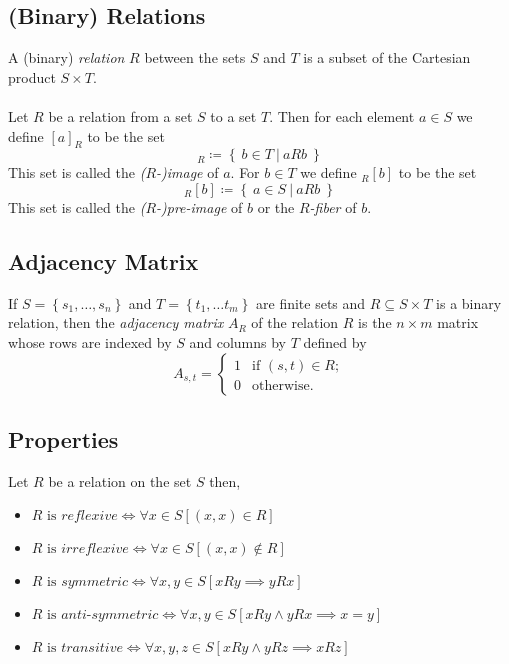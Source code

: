 \documentclass[fleqn]{article}
\begin{document}
\subsection{(Binary) Relations}
A (binary) \textit{relation} $R$ between the sets $S$ and $T$ is a subset of the Cartesian product $S \times T$.\\
\\
Let $R$ be a relation from a set $S$ to a set $T$. Then for each element $a \in S$
we define $[a]_R$ to be the set
\begin{equation*}
    [a]_R \coloneqq \left\{\ b \in T\ |\ aRb\ \right\}
\end{equation*}
This set is called the \textit{($R$-)image} of $a$.
For $b \in T$ we define $_R[b]$ to be the set
\begin{equation*}
    _R[b] \coloneqq \left\{\ a \in S\ |\ aRb\ \right\}
\end{equation*}
This set is called the \textit{($R$-)pre-image} of $b$ or the \textit{$R$-fiber} of $b$.

\subsection{Adjacency Matrix}
If $S = \left\{ s_1, \dots, s_n \right\}$ and $T = \left\{ t_1, \dots t_m \right\}$
are finite sets and $R \subseteq S \times T$ is a binary relation, then the
\textit{adjacency matrix} $A_R$ of the relation $R$ is the $n \times m$ matrix whose
rows are indexed by $S$ and columns by $T$ defined by
\begin{equation*}
    A_{s,t}= \begin{cases}
        1 & \text{if } (s,t) \in R; \\
        0 & \text{otherwise}.
    \end{cases}
\end{equation*}

\subsection{Properties}
\label{sec:Properties}
Let $R$ be a relation on the set $S$ then,
\begin{itemize}
    \item $R \text{ is }\textit{reflexive} \iff \forall x \in S [ (x,x) \in R ]$
    \item $R \text{ is }\textit{irreflexive} \iff \forall x \in S [(x,x) \notin R ]$
    \item $R \text{ is }\textit{symmetric} \iff \forall x,y \in S [ xRy \implies yRx ]$
    \item $R \text{ is }\textit{anti-symmetric} \iff \forall x,y \in S [ xRy \land yRx \implies x = y ]$
    \item $R \text{ is }\textit{transitive} \iff \forall x,y,z \in S [ xRy \land yRz \implies xRz ]$
\end{itemize}
\end{document}
